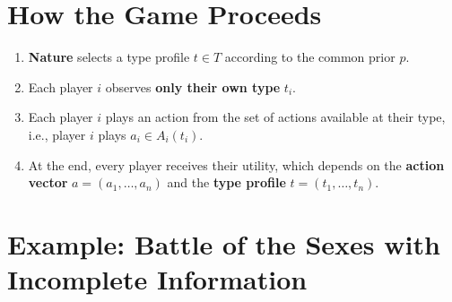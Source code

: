 \documentclass[12pt, a4paper]{article}
\begin{document}
\section{How the Game Proceeds}

\begin{enumerate}
  \item \textbf{Nature} selects a type profile $t \in T$ according to the common prior $p$.
  \item Each player $i$ observes \textbf{only their own type} $t_i$.
  \item Each player $i$ plays an action from the set of actions available at their type, i.e., player $i$ plays $a_i \in A_i(t_i)$.
  \item At the end, every player receives their utility, which depends on the \textbf{action vector} $a = (a_1, \ldots, a_n)$ and the \textbf{type profile} $t = (t_1, \ldots, t_n)$.
\end{enumerate}

\section{Example: Battle of the Sexes with Incomplete Information}
\end{document}
